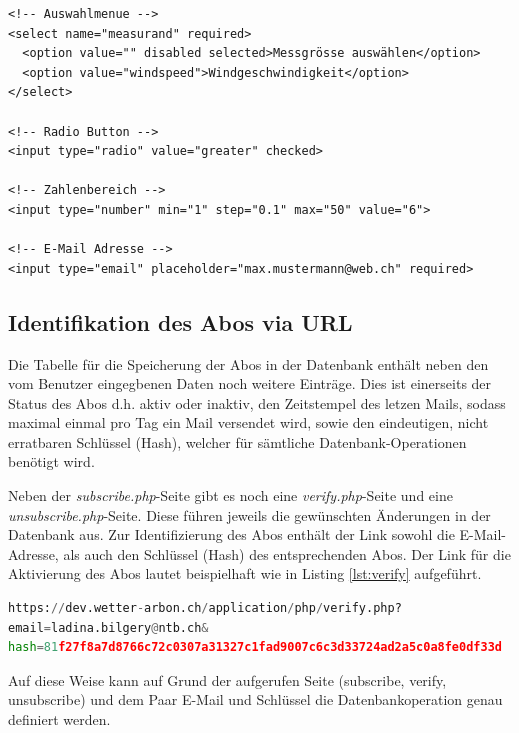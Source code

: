 \begin{lstlisting}[label=lst:HTML5form,caption=Integrierte Formularüberprüfung mit HTML5, language=HTML5, style=htmlcssjs]
<!-- Auswahlmenue -->
<select name="measurand" required>
  <option value="" disabled selected>Messgrösse auswählen</option>
  <option value="windspeed">Windgeschwindigkeit</option>
</select>

<!-- Radio Button -->
<input type="radio" value="greater" checked>

<!-- Zahlenbereich -->
<input type="number" min="1" step="0.1" max="50" value="6">

<!-- E-Mail Adresse -->
<input type="email" placeholder="max.mustermann@web.ch" required>
\end{lstlisting}



\subsection{Identifikation des Abos via URL}
Die Tabelle für die Speicherung der Abos in der Datenbank enthält neben den vom Benutzer eingegbenen Daten noch weitere Einträge. Dies ist einerseits der Status des Abos d.h. aktiv oder inaktiv, den Zeitstempel des letzen Mails, sodass maximal einmal pro Tag ein Mail versendet wird, sowie den eindeutigen, nicht erratbaren Schlüssel (Hash), welcher für sämtliche Datenbank-Operationen benötigt wird.


Neben der \textit{subscribe.php}-Seite gibt es noch eine \textit{verify.php}-Seite und eine \textit{unsubscribe.php}-Seite. Diese führen jeweils die gewünschten Änderungen in der Datenbank aus. Zur Identifizierung des Abos enthält der Link sowohl die E-Mail-Adresse, als auch den Schlüssel (Hash) des entsprechenden Abos. Der Link für die Aktivierung des Abos lautet beispielhaft wie in Listing \ref{lst:verify} aufgeführt.

\begin{lstlisting}[label=lst:verify,caption=Beispiellink für die Aktivierung eines Abos, language=Python, style=py]
https://dev.wetter-arbon.ch/application/php/verify.php?
email=ladina.bilgery@ntb.ch&
hash=81f27f8a7d8766c72c0307a31327c1fad9007c6c3d33724ad2a5c0a8fe0df33d
\end{lstlisting}

Auf diese Weise kann auf Grund der aufgerufen Seite (subscribe, verify, unsubscribe) und dem Paar E-Mail und Schlüssel die Datenbankoperation genau definiert werden.
